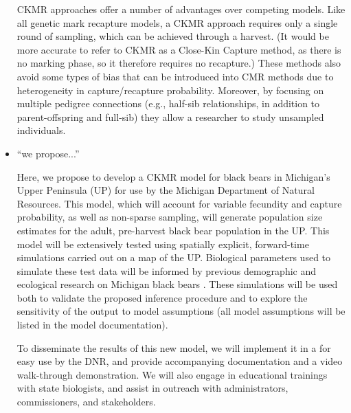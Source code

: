 \documentclass[12pt]{article}
\newcommand{\gb}[1]{{\color{blue}{#1}}}
\begin{document}
\begin{itemize}
CKMR approaches offer a number of advantages 
over competing models. 
Like all genetic mark recapture models, 
a CKMR approach requires only a single round of sampling, 
which can be achieved through a harvest.
(It would be more accurate to refer to CKMR as 
a Close-Kin Capture method, 
as there is no marking phase, 
so it therefore requires no recapture.)
These methods also avoid some types of bias 
that can be introduced into CMR methods due to 
heterogeneity in capture/recapture probability.
Moreover, by focusing on multiple pedigree connections 
(e.g., half-sib relationships, 
in addition to parent-offspring and full-sib) 
they allow a researcher to study unsampled individuals.

\item ``we propose...'' 

Here, we propose to develop a \gb{spatial} CKMR model 
for black bears in Michigan's Upper Peninsula (UP) 
for use by the Michigan Department of Natural Resources.
This model, which will account for 
variable fecundity and capture probability, 
as well as non-sparse sampling, 
will generate population size estimates 
for the adult, pre-harvest black bear population in the UP. 
\gb{We will extend existing CKMR models 
to incorporate geography; 
in addition to generating estimates of total population size, 
this spatial model will also generate maps of estimated 
population density, 
and has the potential to shed light 
on other demographic parameters as well.}
This model will be extensively tested using spatially explicit,  
forward-time simulations carried out on a map of the UP. 
Biological parameters used to simulate these test data 
will be informed by previous demographic and ecological 
research on Michigan black bears \citep{Moore_etal_2014}.
These simulations will be used both to 
validate the proposed inference procedure 
and to explore the sensitivity of the output to model assumptions 
(all model assumptions will be listed in the model documentation).

To disseminate the results of this new model, 
we will implement it in a \gb{graphical user-interface} 
for easy use by the DNR, 
and provide accompanying documentation 
and a video walk-through demonstration. 
We will also engage in educational trainings with state biologists, 
and assist in outreach with 
administrators, commissioners, and stakeholders.


\end{itemize}
\end{document}
